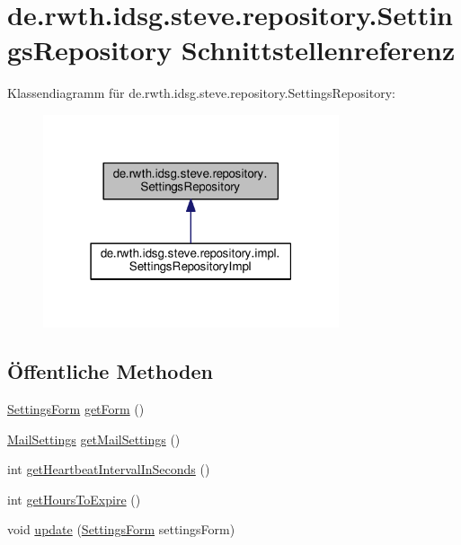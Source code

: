 \hypertarget{interfacede_1_1rwth_1_1idsg_1_1steve_1_1repository_1_1_settings_repository}{\section{de.\+rwth.\+idsg.\+steve.\+repository.\+Settings\+Repository Schnittstellenreferenz}
\label{interfacede_1_1rwth_1_1idsg_1_1steve_1_1repository_1_1_settings_repository}
}


Klassendiagramm für de.\+rwth.\+idsg.\+steve.\+repository.\+Settings\+Repository\+:\nopagebreak
\begin{figure}[H]
\begin{center}
\leavevmode
\includegraphics[width=247pt]{interfacede_1_1rwth_1_1idsg_1_1steve_1_1repository_1_1_settings_repository__inherit__graph}
\end{center}
\end{figure}
\subsection*{Öffentliche Methoden}
\begin{DoxyCompactItemize}
\item 
\hyperlink{classde_1_1rwth_1_1idsg_1_1steve_1_1web_1_1dto_1_1_settings_form}{Settings\+Form} \hyperlink{interfacede_1_1rwth_1_1idsg_1_1steve_1_1repository_1_1_settings_repository_a2e1b2443dd9eb17dd17aa7af5887ceff}{get\+Form} ()
\item 
\hyperlink{classde_1_1rwth_1_1idsg_1_1steve_1_1repository_1_1dto_1_1_mail_settings}{Mail\+Settings} \hyperlink{interfacede_1_1rwth_1_1idsg_1_1steve_1_1repository_1_1_settings_repository_a104dd66876befcdc6175832529bc1a90}{get\+Mail\+Settings} ()
\item 
int \hyperlink{interfacede_1_1rwth_1_1idsg_1_1steve_1_1repository_1_1_settings_repository_adc44ee53b043441a6034598b5b3df2c9}{get\+Heartbeat\+Interval\+In\+Seconds} ()
\item 
int \hyperlink{interfacede_1_1rwth_1_1idsg_1_1steve_1_1repository_1_1_settings_repository_a05dee682f55826f6fc1e29c0ad9928cf}{get\+Hours\+To\+Expire} ()
\item 
void \hyperlink{interfacede_1_1rwth_1_1idsg_1_1steve_1_1repository_1_1_settings_repository_af7ca38a419b1cd8376322c43a4da61a7}{update} (\hyperlink{classde_1_1rwth_1_1idsg_1_1steve_1_1web_1_1dto_1_1_settings_form}{Settings\+Form} settings\+Form)
\end{DoxyCompactItemize}



